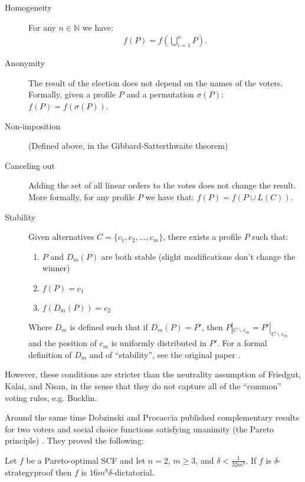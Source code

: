 	\begin{description}
		\item[Homogeneity] For any $n \in \mathbb{N}$ we have:
			\begin{align*}
				f(P) = f\left(\bigcup_{i=1}^n P\right).
			\end{align*}
		\item[Anonymity] The result of the election does not depend on the names of the voters. Formally, given a profile $P$ and a permutation $\sigma(P)$: $f(P) = f(\sigma(P))$.
		\item[Non-imposition] (Defined above, in the Gibbard-Satterthwaite theorem)
		\item[Canceling out] Adding the set of all linear orders to the votes does not change the result. More formally, for any profile $P$ we have that: $f(P) = f(P \cup L(C))$.
		\item[Stability] Given alternatives $C = \{c_1, c_2, \ldots, c_m\}$, there exists a profile $P$ such that:
			\begin{enumerate}
				\item $P$ and $D_{m}(P)$ are both stable (slight modifications don't change the winner)
				\item $f(P) = c_1$
				\item $f(D_{m}(P)) = c_2$
			\end{enumerate}
			Where $D_m$ is defined such that if $D_m(P) = P'$, then $P|_{C \backslash c_m} = P'|_{C \backslash c_m}$ and the position of $c_m$ is uniformly distributed in $P'$. For a formal definition of $D_m$ and of ``stability'', see the original paper \cite{xia2008sufficient}.
	\end{description}

	However, these conditions are stricter than the neutrality assumption of Friedgut, Kalai, and Nisan, in the sense that they do not capture all of the ``common'' voting rules, e.g. Bucklin.

	Around the same time Dobzinski and Procaccia published complementary results for two voters and social choice functions satisfying unanimity (the Pareto principle) \cite{dobzinski2008frequent}. They proved the following:

	\begin{theorem}
		Let $f$ be a Pareto-optimal SCF and let $n = 2$, $m \ge 3$, and $\delta < \frac{1}{32m^9}$. If $f$ is $\delta$-strategyproof then $f$ is $16m^8 \delta$-dictatorial.
	\end{theorem}

